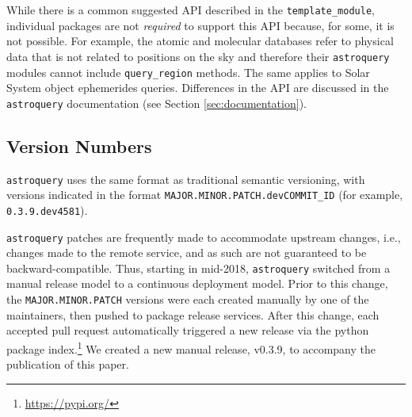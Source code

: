 \documentclass[twocolumn]{aastex62}
\newcommand{\package}[1]{\texttt{#1}\xspace}
\newcommand{\astroquery}{\package{astroquery}}
\newcommand{\astropypkg}{\package{astropy}}
\begin{document}
While there is a common suggested API described in the \texttt{template\_module},
individual packages are not \emph{required} to support this API because, for
some, it is not possible.  For example, the atomic and molecular databases refer
to physical data that is not related to positions on the sky and therefore
their \astroquery modules cannot include \texttt{query\_region} methods. The
same applies to Solar System object ephemerides queries. Differences in the API
are discussed in the \astroquery documentation (see Section
\ref{sec:documentation}).

\subsection{Version Numbers}
\label{sec:versionnumbers}
\astroquery uses the same format as traditional semantic versioning,
with versions indicated in the format \texttt{MAJOR.MINOR.PATCH.devCOMMIT\_ID} (for
example, \texttt{0.3.9.dev4581}).

\astroquery patches are frequently made to accommodate upstream changes, i.e.,
changes made to the remote service, and as such are not guaranteed to be
backward-compatible. Thus, starting in mid-2018, \astroquery switched from a
manual release model to a continuous deployment model.  Prior to this change,
the \texttt{MAJOR.MINOR.PATCH} versions were each created manually by one of
the maintainers, then pushed to package release services.  After this change,
each accepted pull request automatically triggered a new release via the python
package index.\footnote{\url{https://pypi.org/}}   We created a new manual release,
v0.3.9, to accompany the publication of this paper.


%
\end{document}
